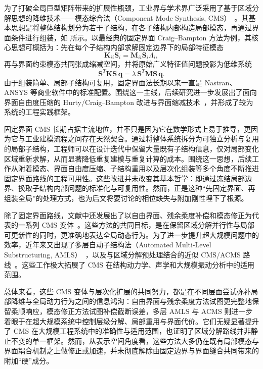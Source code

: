为了打破全局巨型矩阵带来的扩展性瓶颈，工业界与学术界广泛采用了基于区域分解思想的降维技术——模态综合法（Component Mode Synthesis, CMS）~\cite{craig1968coupling,seshu1997substructuring,Vysok2017CurrentCO,GIBANICA2017348}。其基本思想是将整体结构划分为若干子结构，在各子结构内部构造局部模态，再通过界面条件进行组装，如  所示。以最经典的固定界面 Craig--Bampton 方法为例，其核心思想可概括为：先在每个子结构内部求解固定边界下的局部特征模态
\begin{equation}
    \mathbf{K}_{ii} \mathbf{S}_i = \mathbf{M}_{ii} \mathbf{S}_i \Lambda_i,
\end{equation}
再与界面约束模态共同张成缩减空间，并将原始广义特征值问题投影为低维系统
\begin{equation}
    \mathbf{S}^T \mathbf{K} \mathbf{S} \, \mathbf{q} = \lambda \, \mathbf{S}^T \mathbf{M} \mathbf{S} \, \mathbf{q}.
\end{equation}
由于组装简单、局部子结构可复用，固定界面法长期以来一直是 Nastran、ANSYS 等商业软件中的标准配置。围绕这一主线，后续研究进一步发展出了面向界面自由度压缩的 Hurty/Craig--Bampton 改进与界面缩减技术~\cite{KRATTIGER2019Riview,Kuether2017InterfaceReduction}，并形成了较为系统的工程实践框架。

固定界面 CMS 长期占据主流地位，并不只是因为它在数学形式上易于推导，更因为它与工业建模流程之间存在天然契合。通过将整体系统拆分为可独立分析与复用的局部子结构，工程师可以在设计迭代中保留大量既有子结构信息，仅对局部变化区域重新求解，从而显著降低重复建模与重复计算的成本。围绕这一思想，后续工作从附着模态、界面自由度压缩、子结构重用以及层次化组装等多个角度不断推进固定界面路线的工程可用性。这些改进并未改变其基本哲学：即通过冻结局部边界、换取子结构内部问题的标准化与可复用性。然而，正是这种“先固定界面、再组装全局”的处理方式，也为后文将要讨论的相位缺失与附加刚性埋下了根源。

除了固定界面路线，文献中还发展出了以自由界面、残余柔度补偿和模态修正为代表的一系列 CMS 变体~\cite{seshu1997substructuring,William1985CMS}。这些方法的共同目标，是在保留区域分解并行性与局部可更新性的同时，更准确地表达全局动态行为。为了进一步提升超大规模问题中的效率，近年来又出现了多层自动子结构法（Automated Multi-Level Substructuring, AMLS）~\cite{Bennighof2004AMLS,Boo2016ErrorEstimation,Gao2008AMLS}，以及与区域分解预处理结合的近似 CMS/ACMS 路线~\cite{hetmaniuk2010special,Heinlein2015ACMS,Farhat2001FETIDP}。这些工作极大拓展了 CMS 在结构动力学、声学和大规模振动分析中的适用范围。

总体来看，这些 CMS 变体与层次化扩展的共同努力，都是在不同层面尝试弥补局部降维与全局动力行为之间的信息鸿沟：自由界面与残余柔度方法试图更完整地保留柔顺响应，模态修正方法试图补偿截断误差，多层 AMLS 与 ACMS 则进一步着眼于在超大规模系统中控制层级分解、局部重用与界面代价。它们无疑显著提升了 CMS 在大规模工程系统中的准确性与适用范围，也证明了区域分解路线并非静止不变的单一框架。然而，从表示空间角度看，这些方法大多仍在既有局部模态与界面耦合机制之上做修正或加速，并未彻底解除由固定边界与界面缝合共同带来的附加“硬”成分。

